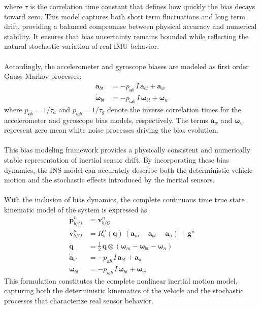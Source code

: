 where $\tau$ is the correlation time constant that defines how quickly the bias decays toward zero. This model captures both short term fluctuations and long term drift, providing a balanced compromise between physical accuracy and numerical stability. It ensures that bias uncertainty remains bounded while reflecting the natural stochastic variation of real IMU behavior.  
\\ \\
Accordingly, the accelerometer and gyroscope biases are modeled as first order Gauss-Markov processes:
$$
\begin{aligned}
    \dot{\mathbf{a}}_{bt} &= -p_{\mathbf{a}b}\,I\,\mathbf{a}_{bt} + \mathbf{a}_{w} \\
    \dot{\mathbf{\omega}}_{bt} &= -p_{\mathbf{\omega}b}\,I\,\mathbf{\omega}_{bt} + \mathbf{\omega}_{w}
\end{aligned}
$$
where $p_{\mathbf{a}b} = 1/\tau_a$ and $p_{\mathbf{\omega}b} = 1/\tau_g$ denote the inverse correlation times for the accelerometer and gyroscope bias models, respectively. The terms $\mathbf{a}_{w}$ and $\mathbf{\omega}_{w}$ represent zero mean white noise processes driving the bias evolution.  
\\ \\
This bias modeling framework provides a physically consistent and numerically stable representation of inertial sensor drift. By incorporating these bias dynamics, the INS model can accurately describe both the deterministic vehicle motion and the stochastic effects introduced by the inertial sensors.  
\\ \\
With the inclusion of bias dynamics, the complete continuous time true state kinematic model of the system is expressed as
$$
\begin{aligned}
    \dot{\mathbf{p}}_{b/O}^{n} &= \mathbf{v}_{b/O}^{n} \\
    \dot{\mathbf{v}}_{b/O}^{n} &= R_b^n(\mathbf{q})\,(\mathbf{a}_m - \mathbf{a}_{bt} - \mathbf{a}_n) + \mathbf{g}^n \\
    \dot{\mathbf{q}} &= \tfrac{1}{2}\,\mathbf{q} \otimes (\boldsymbol{\omega}_m - \mathbf{\omega}_{bt} - \mathbf{\omega}_n) \\
    \dot{\mathbf{a}}_{bt} &= -p_{\mathbf{a}b}\,I\,\mathbf{a}_{bt} + \mathbf{a}_{w} \\
    \dot{\mathbf{\omega}}_{bt} &= -p_{\mathbf{\omega}b}\,I\,\mathbf{\omega}_{bt} + \mathbf{\omega}_{w}
\end{aligned}
$$
This formulation constitutes the complete nonlinear inertial motion model, capturing both the deterministic kinematics of the vehicle and the stochastic processes that characterize real sensor behavior.
